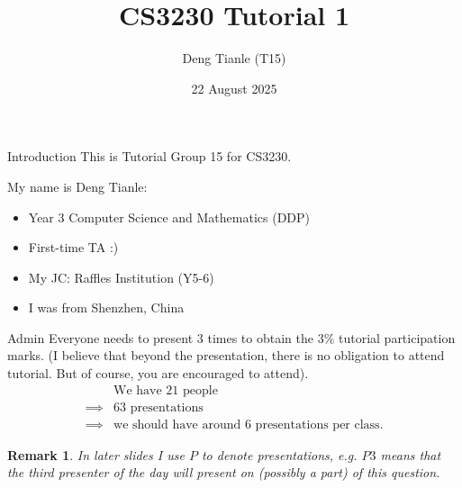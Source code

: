 \documentclass[t]{beamer}
\title{CS3230 Tutorial 1}
\author{Deng Tianle (T15)}
\date{22 August 2025}
\newtheorem{remark}{Remark}
\begin{document}
\frame{\titlepage} 

\begin{frame}{Introduction}
  This is Tutorial Group 15 for CS3230.

  \par My name is Deng Tianle: 
  \begin{itemize}
    \item Year 3 Computer Science and Mathematics (DDP)
    \item First-time TA :)
    \item My JC: Raffles Institution (Y5-6)
    \item I was from Shenzhen, China
  \end{itemize}
\end{frame}
\begin{frame}{Admin}
  Everyone needs to present $3$ times to obtain the $3\%$ tutorial participation marks. (I believe that beyond the presentation, there is no obligation to attend tutorial. But of course, you are encouraged to attend).
  \begin{align*}
    &\text{We have $21$ people} \\ 
    \implies& \text{$63$ presentations} \\
    \implies& \text{we should have around $6$ presentations per class}.
  \end{align*}
  \begin{remark}
    In later slides I use $P$ to denote presentations, e.g. $P3$ means that the third presenter of the day will present on (possibly a part) of this question. 
  \end{remark}
\end{frame}
\end{document}
